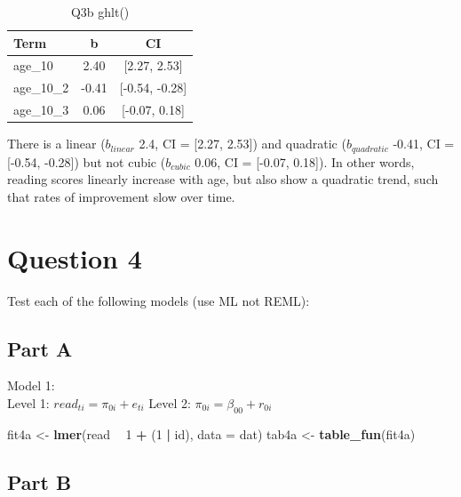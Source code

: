\documentclass[]{article}
\newenvironment{Shaded}{\begin{snugshade}}{\end{snugshade}}
\newcommand{\KeywordTok}[1]{\textcolor[rgb]{0.13,0.29,0.53}{\textbf{#1}}}
\newcommand{\DataTypeTok}[1]{\textcolor[rgb]{0.13,0.29,0.53}{#1}}
\newcommand{\DecValTok}[1]{\textcolor[rgb]{0.00,0.00,0.81}{#1}}
\newcommand{\StringTok}[1]{\textcolor[rgb]{0.31,0.60,0.02}{#1}}
\newcommand{\OperatorTok}[1]{\textcolor[rgb]{0.81,0.36,0.00}{\textbf{#1}}}
\newcommand{\NormalTok}[1]{#1}
\begin{document}
\begin{table}

\caption{\label{tab:unnamed-chunk-4}Q3b ghlt()}
\centering
\begin{tabular}[t]{lcc}
\toprule
Term & b & CI\\
\midrule
age\_10 & 2.40 & [2.27, 2.53]\\
age\_10\_2 & -0.41 & [-0.54, -0.28]\\
age\_10\_3 & 0.06 & [-0.07, 0.18]\\
\bottomrule
\end{tabular}
\end{table}

There is a linear (\(b_{linear}\) 2.4, CI = {[}2.27, 2.53{]}) and
quadratic (\(b_{quadratic}\) -0.41, CI = {[}-0.54, -0.28{]}) but not
cubic (\(b_{cubic}\) 0.06, CI = {[}-0.07, 0.18{]}). In other words,
reading scores linearly increase with age, but also show a quadratic
trend, such that rates of improvement slow over time.

\section{Question 4}\label{question-4}

Test each of the following models (use ML not REML):

\subsection{Part A}\label{part-a-1}

Model 1:\\
Level 1: \(read_{ti} = \pi_{0i} + e_{ti}\) Level 2:
\(\pi_{0i} = \beta_{00} + r_{0i}\)

\begin{Shaded}
\begin{Highlighting}[]
\NormalTok{fit4a <-}\StringTok{ }\KeywordTok{lmer}\NormalTok{(read }\OperatorTok{~}\StringTok{ }\DecValTok{1} \OperatorTok{+}\StringTok{ }\NormalTok{(}\DecValTok{1} \OperatorTok{|}\StringTok{ }\NormalTok{id), }\DataTypeTok{data =}\NormalTok{ dat)}
\NormalTok{tab4a <-}\StringTok{ }\KeywordTok{table_fun}\NormalTok{(fit4a)}
\end{Highlighting}
\end{Shaded}

\subsection{Part B}\label{part-b-1}
\end{document}
